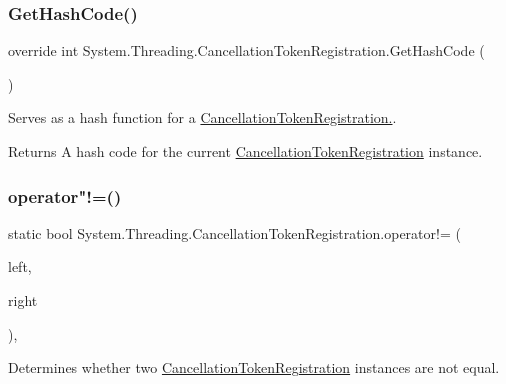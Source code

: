 \subsubsection{\texorpdfstring{Get\+Hash\+Code()}{GetHashCode()}}
{\footnotesize\ttfamily override int System.\+Threading.\+Cancellation\+Token\+Registration.\+Get\+Hash\+Code (\begin{DoxyParamCaption}{ }\end{DoxyParamCaption})\hspace{0.3cm}{\ttfamily [inline]}}



Serves as a hash function for a \hyperlink{}{Cancellation\+Token\+Registration.}. 

\begin{DoxyReturn}{Returns}
A hash code for the current \hyperlink{}{Cancellation\+Token\+Registration} instance.
\end{DoxyReturn}
\mbox{\label{struct_system_1_1_threading_1_1_cancellation_token_registration_a5a456b2e65d092cd851914c0947104ef}} 
\subsubsection{\texorpdfstring{operator"!=()}{operator!=()}}
{\footnotesize\ttfamily static bool System.\+Threading.\+Cancellation\+Token\+Registration.\+operator!= (\begin{DoxyParamCaption}\item[{\hyperlink{struct_system_1_1_threading_1_1_cancellation_token_registration}{Cancellation\+Token\+Registration}}]{left,  }\item[{\hyperlink{struct_system_1_1_threading_1_1_cancellation_token_registration}{Cancellation\+Token\+Registration}}]{right }\end{DoxyParamCaption})\hspace{0.3cm}{\ttfamily [inline]}, {\ttfamily [static]}}



Determines whether two \hyperlink{}{Cancellation\+Token\+Registration} instances are not equal. 



